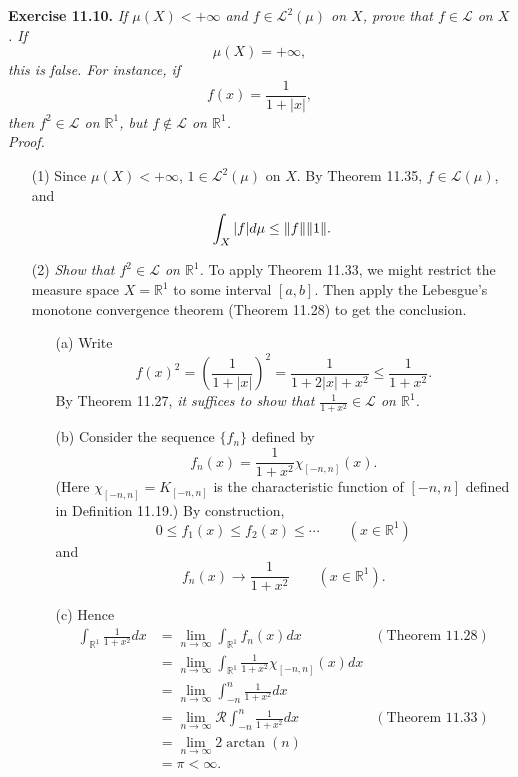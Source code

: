 \documentclass{article}
\begin{document}



\textbf{Exercise 11.10.}
\emph{If $\mu(X) < +\infty$ and $f \in \mathscr{L}^2(\mu)$ on $X$,
prove that $f \in \mathscr{L}$ on $X$.
If
\[
  \mu(X) = +\infty,
\]
this is false. For instance, if
\[
  f(x) = \frac{1}{1+|x|},
\]
then $f^2 \in \mathscr{L}$ on $\mathbb{R}^1$,
but $f \not\in \mathscr{L}$ on $\mathbb{R}^1$.} \\

\emph{Proof.}
\begin{enumerate}
\item[(1)]
Since $\mu(X) < +\infty$, $1 \in \mathscr{L}^2(\mu)$ on $X$.
By Theorem 11.35, $f \in \mathscr{L}(\mu)$, and
\[
  \int_X |f| d\mu
  \leq \norm{f} \norm{1}.
\]

\item[(2)]
  \emph{Show that $f^2 \in \mathscr{L}$ on $\mathbb{R}^1$.}
  To apply Theorem 11.33,
  we might restrict the measure space $X = \mathbb{R}^1$ to some interval $[a,b]$.
  Then apply the Lebesgue's monotone convergence theorem (Theorem 11.28) to get the conclusion.
  \begin{enumerate}
  \item[(a)]
  Write
  \[
    f(x)^2
    = \left(\frac{1}{1+|x|}\right)^2
    = \frac{1}{1 + 2|x| + x^2}
    \leq \frac{1}{1+x^2}.
  \]
  By Theorem 11.27,
  \emph{it suffices to show that $\frac{1}{1+x^2} \in \mathscr{L}$ on $\mathbb{R}^1$.}

  \item[(b)]
  Consider the sequence $\{f_n\}$ defined by
  \[
    f_n(x) = \frac{1}{1+x^2} \chi_{[-n,n]}(x).
  \]
  (Here $\chi_{[-n,n]} = K_{[-n,n]}$ is the characteristic function of $[-n,n]$
  defined in Definition 11.19.)
  By construction,
  \[
    0 \leq f_1(x) \leq f_2(x) \leq \cdots
    \qquad
    (x \in \mathbb{R}^1)
  \]
  and
  \[
    f_n(x) \to \frac{1}{1+x^2}
    \qquad
    (x \in \mathbb{R}^1).
  \]

  \item[(c)]
  Hence
  \begin{align*}
    \int_{\mathbb{R}^1} \frac{1}{1+x^2} dx
    &= \lim_{n \to \infty} \int_{\mathbb{R}^1} f_n(x) dx
      &(\text{Theorem 11.28}) \\
    &= \lim_{n \to \infty} \int_{\mathbb{R}^1} \frac{1}{1+x^2} \chi_{[-n,n]}(x) dx \\
    &= \lim_{n \to \infty} \int_{-n}^{n} \frac{1}{1+x^2} dx \\
    &= \lim_{n \to \infty} \mathscr{R}\int_{-n}^{n} \frac{1}{1+x^2} dx
      &(\text{Theorem 11.33}) \\
    &= \lim_{n \to \infty} 2 \arctan(n) \\
    &= \pi < \infty.
  \end{align*}
  \end{enumerate}


\end{enumerate}
\end{document}
